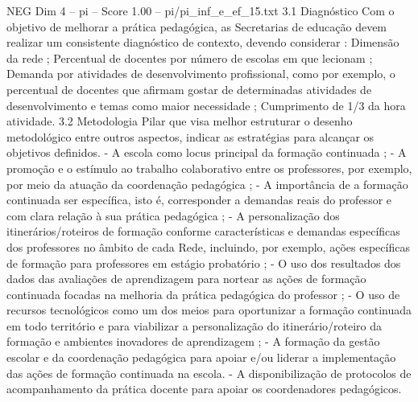 \begin{textsample}{NEG Dim 4 – pi – Score 1.00 – pi/pi\_inf\_e\_ef\_15.txt}  \label{ex:f4_neg_169}
3.1 Diagnóstico Com o objetivo de melhorar a prática pedagógica, as Secretarias de educação devem realizar um consistente diagnóstico de contexto, devendo considerar : Dimensão da rede ; Percentual de docentes por número de escolas em que lecionam ; Demanda por atividades de desenvolvimento profissional, como por exemplo, o percentual de docentes que afirmam gostar de determinadas atividades de desenvolvimento e temas como maior necessidade ; Cumprimento de 1/3 da hora atividade. 3.2 Metodologia Pilar que visa melhor estruturar o desenho metodológico entre outros aspectos, indicar as estratégias para alcançar os objetivos definidos. - A escola como locus principal da formação continuada ; - A promoção e o estímulo ao trabalho colaborativo entre os professores, por exemplo, por meio da atuação da coordenação pedagógica ; - A importância de a formação continuada ser específica, isto é, corresponder a demandas reais do professor e com clara relação à sua prática pedagógica ; - A personalização dos itinerários/roteiros de formação conforme características e demandas específicas dos professores no âmbito de cada Rede, incluindo, por exemplo, ações específicas de formação para professores em estágio probatório ; - O uso dos resultados dos dados das avaliações de aprendizagem para nortear as ações de formação continuada focadas na melhoria da prática pedagógica do professor ; - O uso de recursos tecnológicos como um dos meios para oportunizar a formação continuada em todo território e para viabilizar a personalização do itinerário/roteiro da formação e ambientes inovadores de aprendizagem ; - A formação da gestão escolar e da coordenação pedagógica para apoiar e/ou liderar a implementação das ações de formação continuada na escola. - A disponibilização de protocolos de acompanhamento da prática docente para apoiar os coordenadores pedagógicos.

\end{textsample}
